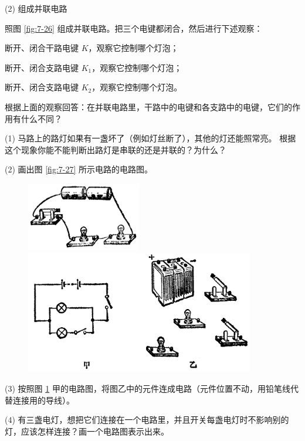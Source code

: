 (2) 组成并联电路

照图 \ref{fig:7-26} 组成并联电路。把三个电键都闭合，然后进行下述观察：

断开、闭合干路电键 $K$，观察它控制哪个灯泡；

断开、闭合支路电键 $K_1$，观察它控制哪个灯泡；

断开、闭合支路电键 $K_2$，观察它控制哪个灯泡。

根据上面的观察回答：在并联电路里，干路中的电键和各支路中的电键，它们的作用有什么不同？


\lianxi

(1) 马路上的路灯如果有一盏坏了（例如灯丝断了），其他的灯还能照常亮。
根据这个现象你能不能判断出路灯是串联的还是并联的？为什么？

(2) 画出图 \ref{fig:7-27} 所示电路的电路图。

\begin{figure}[htbp]
    \centering
    \begin{minipage}{5cm}
    \centering
    \vspace{2cm}
    \includegraphics[width=5cm]{../pic/czwl2-ch7-27}
    \caption{}\label{fig:7-27}
    \end{minipage}
    \qquad
    \begin{minipage}{11cm}
    \centering
    \includegraphics[width=10cm]{../pic/czwl2-ch7-28}
    \caption{}\label{fig:7-28}
    \end{minipage}
\end{figure}

(3) 按照图 \ref{fig:7-28} 甲的电路图，将图乙中的元件连成电路（元件位置不动，用铅笔线代替连接用的导线）。

(4) 有三盏电灯，想把它们连接在一个电路里，并且开关每盏电灯时不影响别的灯，应该怎样连接？画一个电路图表示出来。

